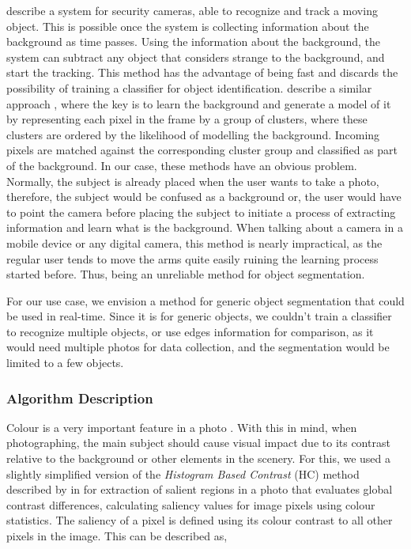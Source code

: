 \citeauthor{yang2004real} \cite{yang2004real} describe a system for security cameras, able to recognize and track a moving object. This is possible once the system is collecting information about the background as time passes. Using the information about the background, the system can subtract any object that considers strange to the background, and start the tracking. This method has the advantage of being fast and discards the possibility of training a classifier for object identification. 
\citeauthor{butler2003real} describe a similar approach \cite{butler2003real}, where the key is to learn the background and generate a model of it by representing each pixel in the frame by a group of clusters, where these clusters are ordered by the likelihood of modelling the background. Incoming pixels are matched against the corresponding cluster group and classified as part of the background.
In our case, these methods have an obvious problem. Normally, the subject is already placed when the user wants to take a photo, therefore, the subject would be confused as a background or, the user would have to point the camera before placing the subject to initiate a process of extracting information and learn what is the background. When talking about a  camera in a mobile device or any digital camera, this method is nearly impractical, as the regular user tends to move the arms quite easily ruining the learning process started before. Thus, being an unreliable method for object segmentation.

For our use case, we envision a method for generic object segmentation that could be used in real-time. Since it is for generic objects, we couldn't train a classifier to recognize multiple objects, or use edges information for comparison, as it would need multiple photos for data collection, and the segmentation would be limited to a few objects. 

\subsubsection{Algorithm Description}
\label{subsub:seg_algorithm}

Colour is a very important feature in a photo \cite{kamps2012rules, Santos}. With this in mind, when photographing, the main subject should cause visual impact due to its contrast relative to the background or other elements in the scenery. For this, we used a slightly simplified version of the \emph{Histogram Based Contrast} (HC) method described by \citeauthor{cheng2011global} in \cite{cheng2011global} for extraction of salient regions in a photo that evaluates global contrast differences, calculating saliency values for image pixels using colour statistics. The saliency of a pixel is defined using its colour contrast to all other pixels in the image. This can be described as,

